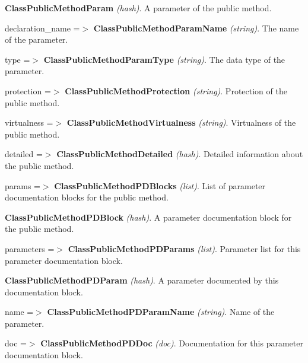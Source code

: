 \begin{DoxyItemize}
\begin{DoxyItemize}
\begin{DoxyItemize}
\begin{DoxyItemize}
\begin{DoxyItemize}
\begin{DoxyItemize}
\begin{DoxyItemize}
\begin{DoxyItemize}
\item {\bfseries ClassPublicMethodParam} {\itshape (hash)\/}. A parameter of the public method. 
\begin{DoxyItemize}
\item declaration\_\-name =$>$ {\bfseries ClassPublicMethodParamName} {\itshape (string)\/}. The name of the parameter. 
\item type =$>$ {\bfseries ClassPublicMethodParamType} {\itshape (string)\/}. The data type of the parameter. 
\end{DoxyItemize}
\end{DoxyItemize}
\item protection =$>$ {\bfseries ClassPublicMethodProtection} {\itshape (string)\/}. Protection of the public method. 
\item virtualness =$>$ {\bfseries ClassPublicMethodVirtualness} {\itshape (string)\/}. Virtualness of the public method. 
\item detailed =$>$ {\bfseries ClassPublicMethodDetailed} {\itshape (hash)\/}. Detailed information about the public method. 
\begin{DoxyItemize}
\item params =$>$ {\bfseries ClassPublicMethodPDBlocks} {\itshape (list)\/}. List of parameter documentation blocks for the public method. 
\begin{DoxyItemize}
\item {\bfseries ClassPublicMethodPDBlock} {\itshape (hash)\/}. A parameter documentation block for the public method. 
\begin{DoxyItemize}
\item parameters =$>$ {\bfseries ClassPublicMethodPDParams} {\itshape (list)\/}. Parameter list for this parameter documentation block. 
\begin{DoxyItemize}
\item {\bfseries ClassPublicMethodPDParam} {\itshape (hash)\/}. A parameter documented by this documentation block. 
\begin{DoxyItemize}
\item name =$>$ {\bfseries ClassPublicMethodPDParamName} {\itshape (string)\/}. Name of the parameter. 
\end{DoxyItemize}
\end{DoxyItemize}
\item doc =$>$ {\bfseries ClassPublicMethodPDDoc} {\itshape (doc)\/}. Documentation for this parameter documentation block. 
\end{DoxyItemize}

\end{DoxyItemize}
\end{DoxyItemize}
\end{DoxyItemize}
\end{DoxyItemize}
\end{DoxyItemize}
\end{DoxyItemize}
\end{DoxyItemize}
\end{DoxyItemize}
\end{DoxyItemize}
